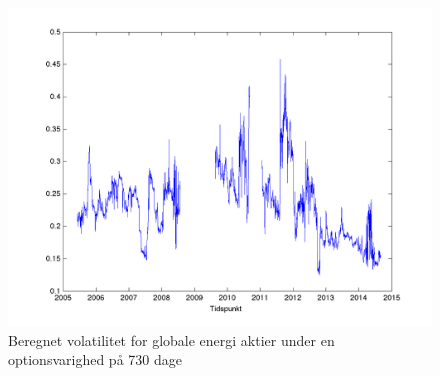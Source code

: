 \documentclass{article}
\begin{document}
\begin{figure}
\includegraphics[scale=0.8]{../matlab/figs/implied_vol_730}
\caption{Beregnet volatilitet for globale energi aktier under en optionsvarighed på 730 dage}
\label{fig:option_vol_730}
\end{figure}
\end{document}
